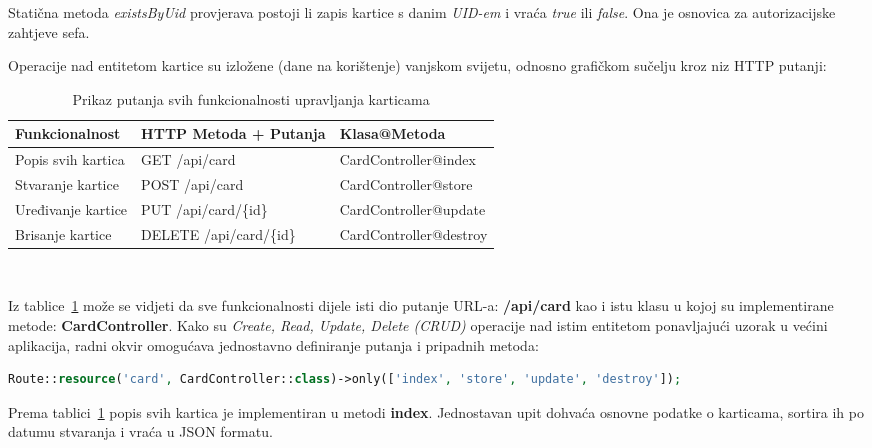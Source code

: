 Statična metoda \textit{existsByUid} provjerava postoji li zapis kartice s danim \textit{UID-em} i vraća \textit{true} ili \textit{false}.
Ona je osnovica za autorizacijske zahtjeve sefa.

\pagebreak

Operacije nad entitetom kartice su izložene (dane na korištenje) vanjskom svijetu, odnosno grafičkom sučelju kroz niz
HTTP putanji:

\begin{table}[h!]
    \centering
    \caption{Prikaz putanja svih funkcionalnosti upravljanja karticama}
    \begin{tabularx}{\textwidth}{|X|X|X|}
        \hline
        \cellcolor{gray!25} Funkcionalnost & \cellcolor{gray!25} HTTP Metoda + Putanja & \cellcolor{gray!25} Klasa@Metoda \\
        \hline
        Popis svih kartica & GET /api/card & CardController@index \\
        \hline
        Stvaranje kartice & POST /api/card & CardController@store \\
        \hline
        Uređivanje kartice & PUT /api/card/\{id\} & CardController@update \\
        \hline
        Brisanje kartice & DELETE /api/card/\{id\} & CardController@destroy \\
        \hline
    \end{tabularx}
    \\[10pt]
    \label{tab:card_functionalities}
\end{table}

Iz tablice~\ref{tab:card_functionalities} može se vidjeti da sve funkcionalnosti dijele isti dio putanje URL-a: \textbf{/api/card}
kao i istu klasu u kojoj su implementirane metode: \textbf{CardController}.
Kako su \textit{Create, Read, Update, Delete (CRUD)} operacije nad istim entitetom ponavljajući uzorak u većini aplikacija, radni okvir omogućava
jednostavno definiranje putanja i pripadnih metoda:

\begin{lstlisting}[language=PHP]
Route::resource('card', CardController::class)->only(['index', 'store', 'update', 'destroy']);
\end{lstlisting}

Prema tablici~\ref{tab:card_functionalities} popis svih kartica je implementiran u metodi \textbf{index}.
Jednostavan upit dohvaća osnovne podatke o karticama, sortira ih po datumu stvaranja i vraća u JSON formatu.

